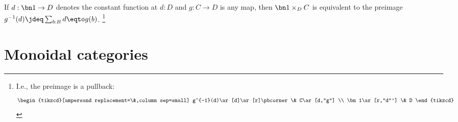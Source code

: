 \begin{example}
  If $d:\bn 1\to D$ denotes the constant function at $d:D$ and $g:C\to D$ is any map,
  then $\bn 1\times_D C$ is equivalent to the preimage $g^{-1}(d)\jdeq\sum_{b:B}d\eqto g(b)$.%
  \footnote{I.e., the preimage is a pullback:
    \[
      \begin{tikzcd}[ampersand replacement=\&,column sep=small]
        g^{-1}(d)\ar[d]\ar[r]\pbcorner \& C\ar[d,"g"] \\
        \bn 1\ar[r,"d"'] \& D
      \end{tikzcd}
    \]}
\end{example}


\section{Monoidal categories}
\label{sec:monoidal-cats}


% 

